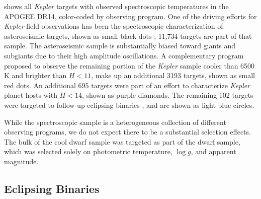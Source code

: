 \documentclass[twocolumn]{aastex6}
\newcommand{\Kepler}{\mbox{\textit{Kepler}}}
\newcommand{\Teff}{\ensuremath{T_{\textrm{eff}}}}
\newcommand{\logg}{\ensuremath{\log g}}
\newcommand{\MK}{\ensuremath{M_{Ks}}}
\begin{document}
\begin{figure*}[htb]
    \centering
    \caption{\emph{Left:} \Teff-\MK{} diagram for the APOGEE observations of
        \Kepler{} targets. Asteroseismic targets are shown as black dots. The
        dwarf sample is shown as brown dots. The light blue dots indicate 
        eclipsing binary targets and purple dots are \Kepler{} Objects of 
        Interest. A binary sequence is clearly visible on the lower main
        sequence. Temperatures are spectroscopic APOGEE temperatures. A 
        representative error bar for the cool dwarf sample is 
        shown in the bottom-left corner, although the vertical error bar is too
        small to be easily visible. \emph{Right:} A density plot of the 
        full APOGEE sample. To preserve the dynamic range of the dwarf 
        sequence, the red clump was allowed to saturate. The bin size is 100 K
    in temperature and 0.02 mag in \(Ks\)-band absolute 
magnitude.}\label{fig:apogee_selection}
\end{figure*}

 shows all \Kepler{} targets with observed
spectroscopic temperatures in the APOGEE DR14, color-coded by observing
program. One of the driving efforts for \Kepler{} field observations has been
the spectroscopic characterization of asteroseismic targets, shown as small
black dots \citep{Zasowski17,Pinsonneault18}; 11,734 targets are part of that
sample. The asteroseismic sample is substantially biased toward giants 
and subgiants due to their high amplitude oscillations. A complementary 
program proposed to observe the remaining portion of the \Kepler{} sample 
cooler than 6500 K and brighter than \(H < 11\), make up an additional 3193
targets, shown as small red dots. An additional 695 targets were part of an 
effort to characterize \Kepler{} planet hosts with \(H < 14\), shown as purple 
diamonds. The remaining 102 targets were targeted to follow-up 
eclipsing binaries \citep{Prsa11,Slawson11}, and are shown as light blue 
circles.  

While the spectroscopic sample is a heterogeneous collection of different
observing programs, we do not expect there to be a substantial selection
effects. The bulk of the cool dwarf sample was
targeted as part of the dwarf sample, which was selected solely on photometric 
temperature, \logg, and apparent magnitude. 


\subsection{Eclipsing Binaries}
\end{document}
